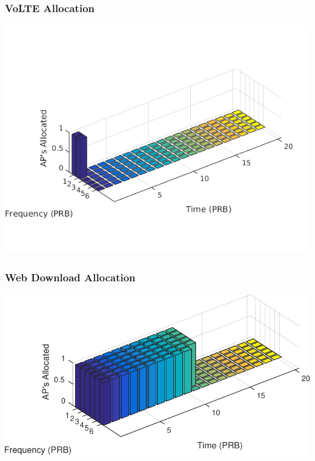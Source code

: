 \documentclass{beamer}
\begin{document}

\begin{frame}
\frametitle{VoLTE Allocation}
\begin{center}
\includegraphics[height=0.65\linewidth]{images/volte.png}
\end{center}
\end{frame}


\begin{frame}
\frametitle{Web Download Allocation}
\begin{center}
\includegraphics[width=0.8\linewidth]{images/webdl-crop.pdf}
\end{center}
\end{frame}

\end{document}
